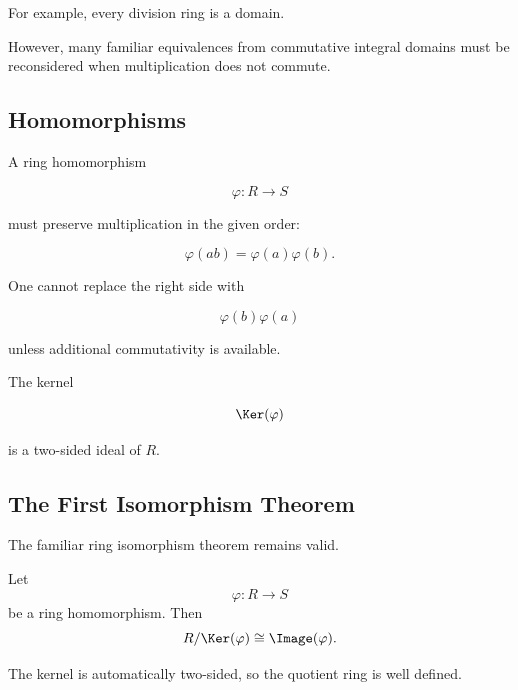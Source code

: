 For example, every division ring is a domain.

However, many familiar equivalences from commutative integral domains must
be reconsidered when multiplication does not commute.

\subsection{Homomorphisms}
\label{subsec:noncommutative-homomorphisms}

A ring homomorphism

\[ \varphi:R\to S \]

must preserve multiplication in the given order:

\[ \varphi(ab)=\varphi(a)\varphi(b). \]

One cannot replace the right side with

\[ \varphi(b)\varphi(a) \]

unless additional commutativity is available.

The kernel

\[ \Ker(\varphi) \]

is a two-sided ideal of \(R\).

\subsection{The First Isomorphism Theorem}
\label{subsec:noncommutative-first-isomorphism}

The familiar ring isomorphism theorem remains valid.

\begin{theorem}
Let
\[ \varphi:R\to S \]
be a ring homomorphism. Then
\[ R/\Ker(\varphi)\cong\Image(\varphi). \]
\end{theorem}

The kernel is automatically two-sided, so the quotient ring is well defined.

\begin{center}
\end{center}

